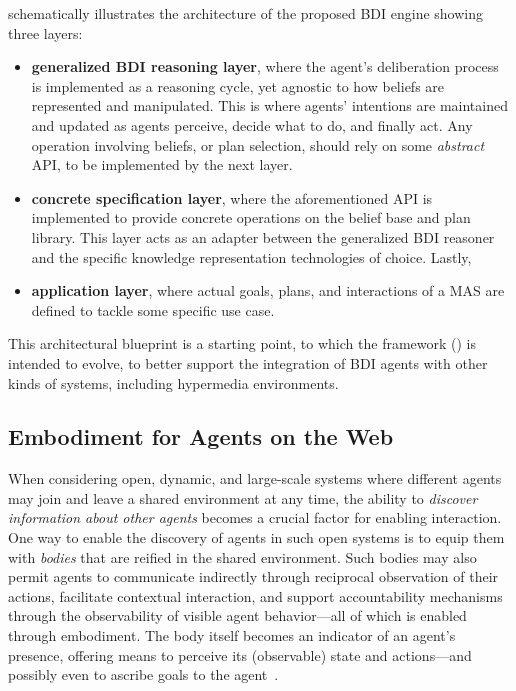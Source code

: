  schematically illustrates the architecture of the proposed \ac{BDI} engine showing three layers:
\begin{itemize}
  \item \textbf{generalized \ac{BDI} reasoning layer},
  where the agent's deliberation process is implemented as a reasoning cycle,
  yet agnostic to how beliefs are represented and manipulated.
  This is where
  agents' intentions are maintained
  and updated as agents perceive,
  decide what to do,
  and finally act.
  Any operation involving beliefs, or plan selection, should rely on some \emph{abstract} \acs{API},
  to be implemented by the next layer.
  \item \textbf{concrete specification layer},
  where the aforementioned \acs{API} is implemented to provide concrete operations on the belief base and plan library.
  This layer acts as an adapter between the generalized \ac{BDI} reasoner
  and the specific knowledge representation technologies of choice.
  Lastly,
    \item \textbf{application layer},
  where actual goals, plans, and interactions of a \ac{MAS} are defined
  to tackle some specific use case.
\end{itemize}

This architectural blueprint is a starting point, to which the \jakta{} framework () is intended to evolve, to better support the integration of \ac{BDI} agents with other kinds of systems, including hypermedia environments. 

\subsection{Embodiment for Agents on the Web}

When considering open, dynamic, and large-scale systems where different agents may join and leave a shared environment at any time, the ability to \emph{discover information about other agents} becomes a crucial factor for enabling interaction.
%
One way to enable the discovery of agents in such open systems is to equip them with \emph{bodies} that are reified in the shared environment.
Such bodies may also permit agents to communicate indirectly through reciprocal observation of their actions, facilitate contextual interaction, and support accountability mechanisms through the observability of visible agent behavior---all of which is enabled through embodiment.
%
The body itself becomes an indicator of an agent's presence, offering means to perceive its (observable) state and actions---and possibly even to ascribe goals to the agent~\cite{castelfranchi2012abscribingminds}.

